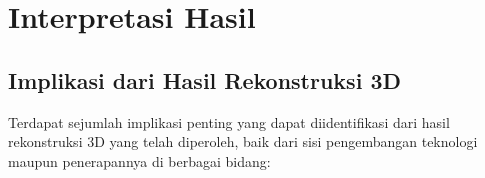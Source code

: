 \documentclass[12pt,a4paper]{article}
\begin{document}



\section{Interpretasi Hasil}

\subsection{Implikasi dari Hasil Rekonstruksi 3D}

Terdapat sejumlah implikasi penting yang dapat diidentifikasi dari hasil rekonstruksi 3D yang telah diperoleh, baik dari sisi pengembangan teknologi maupun penerapannya di berbagai bidang:
\end{document}

